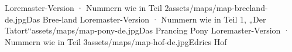 


\fwnotice

%
  {Loremaster-Version · Nummern wie in Teil 2}{assets/maps/map-breeland-de.jpg}{Das Bree-land}
%
  {Loremaster-Version · Nummern wie in Teil 1, „Der Tatort“}{assets/maps/map-pony-de.jpg}{Das Prancing Pony}
%
  {Loremaster-Version · Nummern wie in Teil 3}{assets/maps/map-hof-de.jpg}{Edrics Hof}
\label{fw-lastnum}



